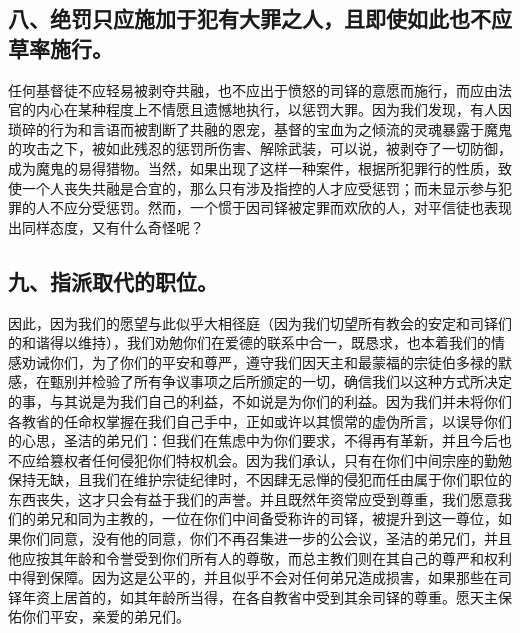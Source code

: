 
\subsection{八、绝罚只应施加于犯有大罪之人，且即使如此也不应草率施行。}

任何基督徒不应轻易被剥夺共融，也不应出于愤怒的司铎的意愿而施行，而应由法官的内心在某种程度上不情愿且遗憾地执行，以惩罚大罪。因为我们发现，有人因琐碎的行为和言语而被割断了共融的恩宠，基督的宝血为之倾流的灵魂暴露于魔鬼的攻击之下，被如此残忍的惩罚所伤害、解除武装，可以说，被剥夺了一切防御，成为魔鬼的易得猎物。当然，如果出现了这样一种案件，根据所犯罪行的性质，致使一个人丧失共融是合宜的，那么只有涉及指控的人才应受惩罚；而未显示参与犯罪的人不应分受惩罚。然而，一个惯于因司铎被定罪而欢欣的人，对平信徒也表现出同样态度，又有什么奇怪呢？\par


\subsection{九、指派取代的职位。}

因此，因为我们的愿望与此似乎大相径庭（因为我们切望所有教会的安定和司铎们的和谐得以维持），我们劝勉你们在爱德的联系中合一，既恳求，也本着我们的情感劝诫你们，为了你们的平安和尊严，遵守我们因天主和最蒙福的宗徒伯多禄的默感，在甄别并检验了所有争议事项之后所颁定的一切，确信我们以这种方式所决定的事，与其说是为我们自己的利益，不如说是为你们的利益。因为我们并未将你们各教省的任命权掌握在我们自己手中，正如或许以其惯常的虚伪所言，以误导你们的心思，圣洁的弟兄们：但我们在焦虑中为你们要求，不得再有革新，并且今后也不应给篡权者任何侵犯你们特权机会。因为我们承认，只有在你们中间宗座的勤勉保持无缺，且我们在维护宗徒纪律时，不因肆无忌惮的侵犯而任由属于你们职位的东西丧失，这才只会有益于我们的声誉。并且既然年资常应受到尊重，我们愿意我们的弟兄和同为主教的，一位在你们中间备受称许的司铎，被提升到这一尊位，如果你们同意，没有他的同意，你们不再召集进一步的公会议，圣洁的弟兄们，并且他应按其年龄和令誉受到你们所有人的尊敬，而总主教们则在其自己的尊严和权利中得到保障。因为这是公平的，并且似乎不会对任何弟兄造成损害，如果那些在司铎年资上居首的，如其年龄所当得，在各自教省中受到其余司铎的尊重。愿天主保佑你们平安，亲爱的弟兄们。\par


